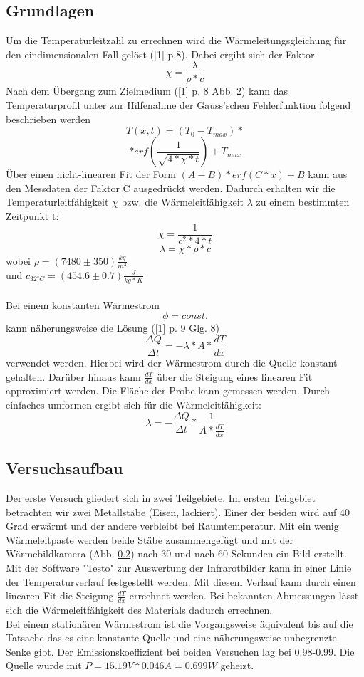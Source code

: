 \documentclass[12pt,a4paper]{article}
\begin{document}
\begin{multicols}{2}
\subsection{Grundlagen}
Um die Temperaturleitzahl zu errechnen wird die Wärmeleitungsgleichung für den eindimensionalen Fall gelöst ([1] p.8). Dabei ergibt sich der Faktor 
$$\chi = \frac{\lambda}{\rho*c}$$
Nach dem Übergang zum Zielmedium ([1] p. 8 Abb. 2) kann das Temperaturprofil unter zur Hilfenahme der Gauss'schen  Fehlerfunktion folgend beschrieben werden
$$T(x,t) = (T_0 - T_{max}) * $$
$$ * erf(\frac{1}{\sqrt{4 * \chi * t}})+T_{max}$$
Über einen nicht-linearen Fit der Form $(A-B) * erf(C * x) + B$ kann aus den Messdaten der Faktor C ausgedrückt werden.
Dadurch erhalten wir die Temperaturleitfähigkeit $\chi$ bzw. die Wärmeleitfähigkeit $\lambda$ zu einem bestimmten Zeitpunkt t:
$$\chi = \frac{1}{c^2 * 4 * t}$$
$$\lambda = \chi * \rho * c$$
wobei $\rho = (7480 \pm 350)\frac{kg}{m^3}$\\ 
und $c_{32^{\circ}C} = (454.6 \pm 0.7)\frac{J}{kg * K}$\\
\\
Bei einem konstanten Wärmestrom
$$\phi = const.$$
kann näherungsweise die Lösung ([1] p. 9 Glg. 8) 
$$\frac{\Delta Q}{\Delta t} = -\lambda * A * \frac{dT}{dx}$$
verwendet werden.
Hierbei wird der Wärmestrom durch die Quelle konstant gehalten. Darüber hinaus kann $\frac{dT}{dx}$ über die Steigung eines linearen Fit approximiert werden.
Die Fläche der Probe kann gemessen werden. Durch einfaches umformen ergibt sich für die Wärmeleitfähigkeit:
$$ \lambda = - \frac{\Delta Q}{\Delta t} * \frac{1}{A * \frac{dT}{dx}} $$
\subsection{Versuchsaufbau}
Der erste Versuch gliedert sich in zwei Teilgebiete. Im ersten Teilgebiet betrachten wir zwei Metallstäbe (Eisen, lackiert). Einer der beiden wird auf 40 Grad erwärmt und der andere verbleibt bei Raumtemperatur. Mit ein wenig Wärmeleitpaste werden beide Stäbe zusammengefügt und mit der Wärmebildkamera (Abb. \ref{}) nach 30 und nach 60 Sekunden ein Bild erstellt.\\
Mit der Software "Testo" zur Auswertung der Infrarotbilder kann in einer Linie der Temperaturverlauf festgestellt werden.
Mit diesem Verlauf kann durch einen linearen Fit die Steigung $\frac{dT}{dx}$ errechnet werden. Bei bekannten Abmessungen lässt sich die Wärmeleitfähigkeit des Materials dadurch errechnen. \\
Bei einem stationären Wärmestrom ist die Vorgangsweise äquivalent bis auf die Tatsache das es eine konstante Quelle und eine näherungsweise unbegrenzte Senke gibt.
Der Emissionskoeffizient bei beiden Versuchen lag bei 0.98-0.99.
Die Quelle wurde mit $P = 15.19V * 0.046A = 0.699 W$ geheizt.

\end{multicols}
\end{document}
